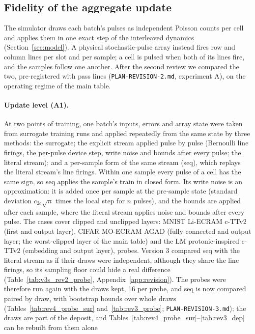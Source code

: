 \subsection{Fidelity of the aggregate update}\label{sec:fidelity}
The simulator draws each batch's pulses as independent Poisson counts per cell and applies them in one exact step of the
interleaved dynamics (Section~\ref{sec:model}). A physical stochastic-pulse array instead fires row and column lines per slot
and per sample; a cell is pulsed when both of its lines fire, and the samples follow one another. After the second review we
compared the two, pre-registered with pass lines (\texttt{PLAN-REVISION-2.md}, experiment A), on the operating regime of the
main table.

\paragraph{Update level (A1).} At two points of training, one batch's inputs, errors and array state were taken from surrogate
training runs and applied repeatedly from the same state by three methods: the surrogate; the explicit stream applied pulse by
pulse (Bernoulli line firings, the per-pulse device step, write noise and bounds after every pulse; the literal stream); and a
per-sample form of the same stream (seq), which replays the literal stream's line firings. Within one sample every pulse of a
cell has the same sign, so seq applies the sample's train in closed form. Its write noise is an approximation: it is added once
per sample at the pre-sample state (standard deviation $c_{2c}\sqrt{n}$ times the local step for $n$ pulses), and the bounds are
applied after each sample, where the literal stream applies noise and bounds after every pulse. The cases cover clipped and
unclipped layers: MNIST Li-ECRAM c-TTv2 (first and output layer), CIFAR MO-ECRAM AGAD (fully connected and output layer; the
worst-clipped layer of the main table) and the LM protonic-inspired c-TTv2 (embedding and output layer), \RYProbeN{} probes.
Version 3 compared seq with the literal stream as if their draws were independent, although they share the line firings, so
its sampling floor could hide a real difference (Table~\ref{tab:v3s_rev2_probe}, Appendix~\ref{app:revision}). The probes were
therefore run again with the draws kept, 16 per probe, and seq is now compared paired by draw, with bootstrap bounds over whole
draws (Tables~\ref{tab:rev4_probe_sur} and~\ref{tab:rev3_probe}; \texttt{PLAN-REVISION-3.md}); the draws are part of
the deposit, and Tables~\ref{tab:rev4_probe_sur}--\ref{tab:rev3_dep} can be rebuilt from them alone
